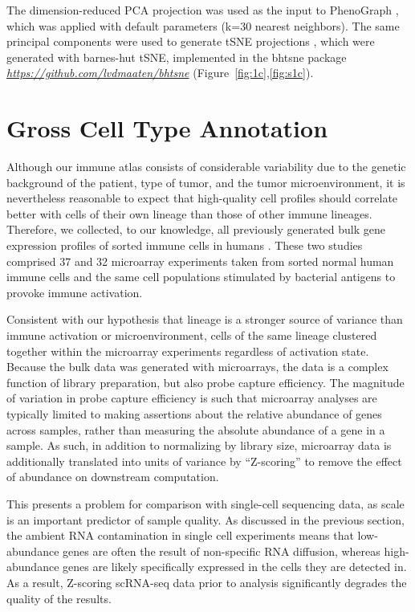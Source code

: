 The dimension-reduced PCA projection was used as the input to PhenoGraph \citep{Levine2015}, which was applied with default parameters (k=30 nearest neighbors). 
The same principal components were used to generate tSNE projections \citep{Maaten2008}, which were generated with barnes-hut tSNE, implemented in the bhtsne package \href{https://github.com/lvdmaaten/bhtsne}{\emph{https://github.com/lvdmaaten/bhtsne}} (Figure~\ref{fig:1c},\ref{fig:s1c}).

\section{Gross Cell Type Annotation}

Although our immune atlas consists of considerable variability due to the genetic background of the patient, type of tumor, and the tumor microenvironment, it is nevertheless reasonable to expect that high-quality cell profiles should correlate better with cells of their own lineage than those of other immune lineages. 
Therefore, we collected, to our knowledge, all previously generated bulk gene expression profiles of sorted immune cells in humans \citep{Novershtern2011,Jeffrey2006}.
These two studies comprised 37 and 32 microarray experiments taken from sorted normal human immune cells and the same cell populations stimulated by bacterial antigens to provoke immune activation. 

Consistent with our hypothesis that lineage is a stronger source of variance than immune activation or microenvironment, cells of the same lineage clustered together within the microarray experiments regardless of activation state. 
Because the bulk data was generated with microarrays, the data is a complex function of library preparation, but also probe capture efficiency. 
The magnitude of variation in probe capture efficiency is such that microarray analyses are typically limited to making assertions about the relative abundance of genes across samples, rather than measuring the absolute abundance of a gene in a sample. %
As such, in addition to normalizing by library size, microarray data is additionally translated into units of variance by ``Z-scoring'' to remove the effect of abundance on downstream computation. 

This presents a problem for comparison with single-cell sequencing data, as scale is an important predictor of sample quality. As discussed in the previous section, the ambient RNA contamination in single cell experiments means that low-abundance genes are often the result of non-specific RNA diffusion, whereas high-abundance genes are likely specifically expressed in the cells they are detected in. 
As a result, Z-scoring scRNA-seq data prior to analysis significantly degrades the quality of the results. 

